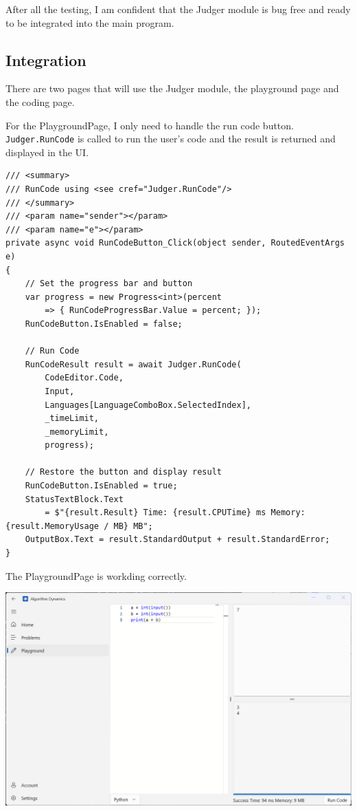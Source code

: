 \documentclass[a4paper]{report}
\newcommand{\code}{\texttt}
\begin{document}
After all the testing, I am confident that the Judger module is bug free and ready to be integrated into the main program.

\subsection{Integration}

There are two pages that will use the Judger module, the playground page and the coding page.

For the PlaygroundPage, I only need to handle the run code button. \code{Judger.RunCode} is called to run the user's code and the result is returned and displayed in the UI.

\begin{verbatim}
/// <summary>
/// RunCode using <see cref="Judger.RunCode"/>
/// </summary>
/// <param name="sender"></param>
/// <param name="e"></param>
private async void RunCodeButton_Click(object sender, RoutedEventArgs e)
{
    // Set the progress bar and button
    var progress = new Progress<int>(percent 
        => { RunCodeProgressBar.Value = percent; });
    RunCodeButton.IsEnabled = false;

    // Run Code
    RunCodeResult result = await Judger.RunCode(
        CodeEditor.Code,
        Input,
        Languages[LanguageComboBox.SelectedIndex],
        _timeLimit,
        _memoryLimit,
        progress);

    // Restore the button and display result
    RunCodeButton.IsEnabled = true;
    StatusTextBlock.Text 
        = $"{result.Result} Time: {result.CPUTime} ms Memory: {result.MemoryUsage / MB} MB";
    OutputBox.Text = result.StandardOutput + result.StandardError;
}
\end{verbatim}

The PlaygroundPage is workding correctly.

\includegraphics[width=\textwidth, height=\textheight, keepaspectratio]{PlaygroundPage-RunCode}
\end{document}
